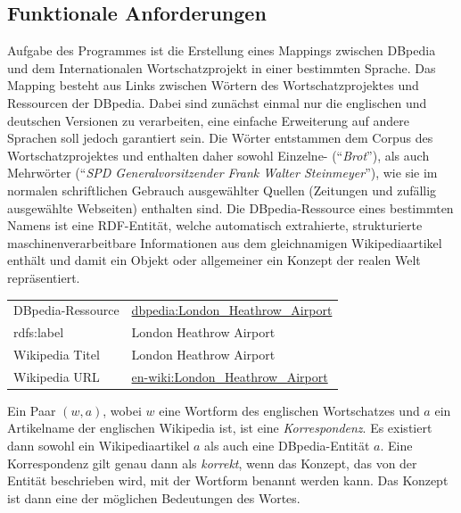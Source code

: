 \subsection{Funktionale Anforderungen}
Aufgabe des Programmes ist die Erstellung eines Mappings zwischen DBpedia und dem Internationalen Wortschatzprojekt in einer bestimmten Sprache.
Das Mapping besteht aus Links zwischen Wörtern des Wortschatzprojektes und Ressourcen der DBpedia.
Dabei sind zunächst einmal nur die englischen und deutschen Versionen zu verarbeiten, eine einfache Erweiterung auf andere Sprachen soll jedoch garantiert sein.
Die Wörter entstammen dem Corpus des Wortschatzprojektes und enthalten daher sowohl Einzelne- ("`\emph{Brot}"'), als auch Mehrwörter ("`\emph{SPD Generalvorsitzender Frank Walter Steinmeyer}"'),
 wie sie im normalen schriftlichen Gebrauch ausgewählter Quellen (Zeitungen und zufällig ausgewählte Webseiten) enthalten sind.
Die DBpedia-Ressource eines bestimmten Namens ist eine RDF-Entität, welche automatisch extrahierte, strukturierte maschinenverarbeitbare Informationen 
aus dem gleichnamigen Wikipediaartikel enthält und damit ein Objekt oder allgemeiner ein Konzept der realen Welt repräsentiert.
\begin{center}
\begin{tabular}{ll}
\toprule
DBpedia-Ressource & \url{dbpedia:London_Heathrow_Airport}\\
rdfs:label & London Heathrow Airport\\
Wikipedia Titel & London Heathrow Airport\\
Wikipedia URL & \url{en-wiki:London_Heathrow_Airport}\\
\bottomrule
\end{tabular}
\end{center}

\begin{dfn}\label{dfn:korrekte_korrespondenz}
Ein Paar $(w,a)$, wobei $w$ eine Wortform des englischen Wortschatzes und $a$ ein Artikelname der englischen Wikipedia ist, ist eine \emph{Korrespondenz}.
Es existiert dann sowohl ein Wikipediaartikel $a$ als auch eine DBpedia-Entität $a$.
Eine Korrespondenz gilt genau dann als \emph{korrekt}, wenn das Konzept, das von der Entität beschrieben wird, mit der Wortform benannt werden kann.
Das Konzept ist dann eine der möglichen Bedeutungen des Wortes.
\end{dfn}

